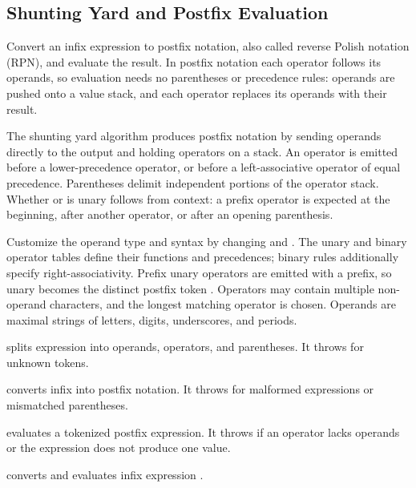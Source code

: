 \subsection{Shunting Yard and Postfix Evaluation}
\label{sec:3.7.2}
Convert an infix expression to postfix notation, also called reverse Polish notation (RPN), and evaluate the result. In postfix notation each operator follows its operands, so evaluation needs no parentheses or precedence rules: operands are pushed onto a value stack, and each operator replaces its operands with their result.

The shunting yard algorithm produces postfix notation by sending operands directly to the output and holding operators on a stack. An operator is emitted before a lower-precedence operator, or before a left-associative operator of equal precedence. Parentheses delimit independent portions of the operator stack. Whether \inlinecode{+} or \inlinecode{-} is unary follows from context: a prefix operator is expected at the beginning, after another operator, or after an opening parenthesis.

Customize the operand type and syntax by changing  and . The unary and binary operator tables define their functions and precedences; binary rules additionally specify right-associativity. Prefix unary operators are emitted with a  prefix, so unary \inlinecode{-} becomes the distinct postfix token . Operators may contain multiple non-operand characters, and the longest matching operator is chosen. Operands are maximal strings of letters, digits, underscores, and periods.

\begin{compactitem}
  \item {} splits expression  into operands, operators, and parentheses. It throws  for unknown tokens.
  \item {} converts infix  into postfix notation. It throws  for malformed expressions or mismatched parentheses.
  \item {} evaluates a tokenized postfix expression. It throws  if an operator lacks operands or the expression does not produce one value.
  \item {} converts and evaluates infix expression .
\end{compactitem}

